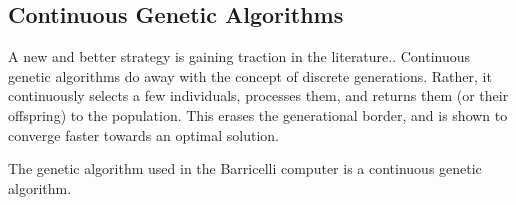 \subsection{Continuous Genetic Algorithms}

A new and better strategy is gaining traction in the literature..
Continuous genetic algorithms do away with the concept of discrete generations.
Rather, it continuously selects a few individuals, processes them, and returns them (or their offspring) to the population.
This erases the generational border, and is shown  to converge faster towards an optimal solution.

The genetic algorithm used in the Barricelli computer is a continuous genetic algorithm.

